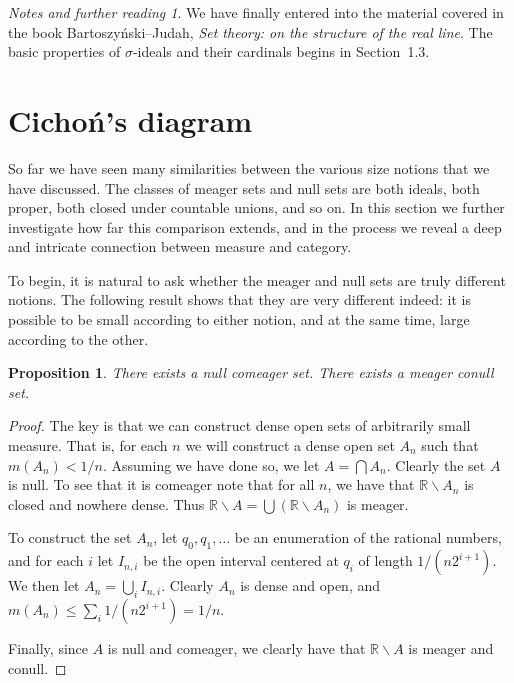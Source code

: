 \documentclass[11pt,oneside]{amsbook}
\newcommand{\RR}{\mathbb R}
\theoremstyle{definition}
\theoremstyle{plain}
\newtheorem{prop}[thm]{Proposition}
\theoremstyle{definition}
\theoremstyle{remark}
\newtheorem*{notes}{Notes and further reading}
\begin{document}
\begin{notes}
  We have finally entered into the material covered in the book Bartoszy\'nski--Judah, \emph{Set theory: on the structure of the real line}. The basic properties of $\sigma$-ideals and their cardinals begins in Section~1.3.
\end{notes}


\section{Cicho\'n's diagram}

So far we have seen many similarities between the various size notions that we have discussed. The classes of meager sets and null sets are both ideals, both proper, both closed under countable unions, and so on. In this section we further investigate how far this comparison extends, and in the process we reveal a deep and intricate connection between measure and category.

To begin, it is natural to ask whether the meager and null sets are truly different notions. The following result shows that they are very different indeed: it is possible to be small according to either notion, and at the same time, large according to the other.

\begin{prop}
  \label{prop:null-comeager}
  There exists a null comeager set. There exists a meager conull set.  \end{prop}

\begin{proof}
  The key is that we can construct dense open sets of arbitrarily small measure. That is, for each $n$ we will construct a dense open set $A_n$ such that $m(A_n)<1/n$. Assuming we have done so, we let $A=\bigcap A_n$. Clearly the set $A$ is null. To see that it is comeager note that for all $n$, we have that $\RR\smallsetminus A_n$ is closed and nowhere dense. Thus $\RR\smallsetminus A=\bigcup(\RR\smallsetminus A_n)$ is meager.

  To construct the set $A_n$, let $q_0,q_1,\ldots$ be an enumeration of the rational numbers, and for each $i$ let $I_{n,i}$ be the open interval centered at $q_i$ of length $1/(n2^{i+1})$. We then let $A_n=\bigcup_iI_{n,i}$. Clearly $A_n$ is dense and open, and $m(A_n)\leq\sum_i1/(n2^{i+1})=1/n$.

  Finally, since $A$ is null and comeager, we clearly have that $\RR\smallsetminus A$ is meager and conull.
\end{proof}
\end{document}
